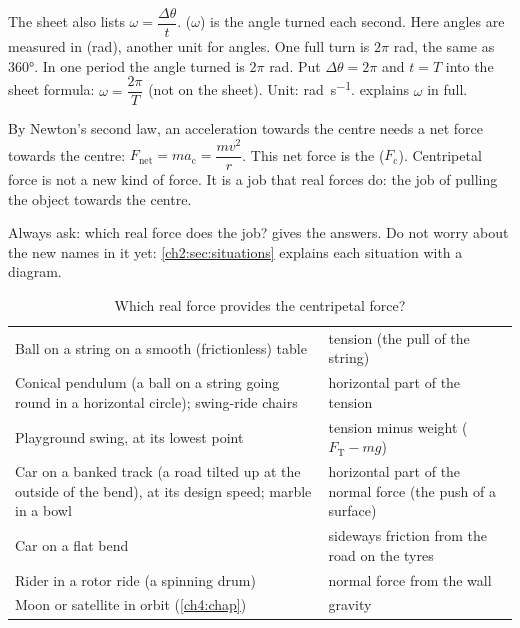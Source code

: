 The sheet also lists $\omega = \dfrac{\Delta\theta}{t}$.  ($\omega$)
is the angle turned each second. Here angles are measured in  (rad), another
unit for angles. One full turn is $2\pi$ rad, the same as \ang{360}. In one period the angle
turned is $2\pi$ rad. Put $\Delta\theta = 2\pi$ and $t = T$ into the sheet formula:
$\omega = \dfrac{2\pi}{T}$ (not on the sheet). Unit: \si{rad.s^{-1}}. 
explains $\omega$ in full.

By Newton's second law, an acceleration towards the centre needs a net force towards the
centre: $F_\mathrm{net} = ma_\mathrm{c} = \dfrac{mv^2}{r}$. This net force is the
 ($F_\mathrm{c}$). Centripetal force is not a new kind of force. It
is a job that real forces do: the job of pulling the object towards the centre.

Always ask: which real force does the job?  gives the answers. Do not
worry about the new names in it yet: \cref{ch2:sec:situations} explains each situation with
a diagram.

\begin{table}
  \caption{Which real force provides the centripetal force?}\label{ch2:tab:jobs}
  \centering
  \begin{tabular}{@{}L{78mm}L{62mm}@{}}
    \toprule
     & \\
    \midrule
    Ball on a string on a smooth (frictionless) table & tension (the pull of the string)\\
    Conical pendulum (a ball on a string going round in a horizontal circle);
      swing-ride chairs & horizontal part of the tension\\
    Playground swing, at its lowest point & tension minus weight ($F_\mathrm{T} - mg$)\\
    Car on a banked track (a road tilted up at the outside of the bend), at its design
      speed; marble in a bowl & horizontal part of the normal force (the push of a
      surface)\\
    Car on a flat bend & sideways friction from the road on the tyres\\
    Rider in a rotor ride (a spinning drum) & normal force from the wall\\
    Moon or satellite in orbit (\cref{ch4:chap}) & gravity\\
    \bottomrule
  \end{tabular}
\end{table}

